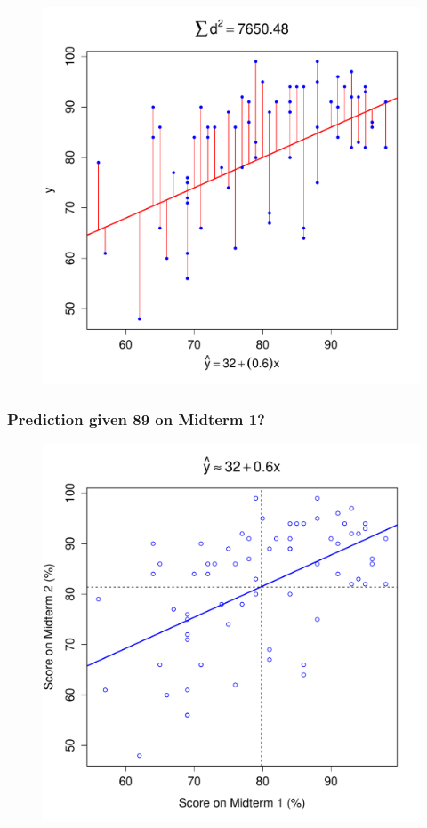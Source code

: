 \documentclass[handout]{beamer}
\begin{document}
\begin{frame}
\begin{figure}
	\includegraphics[scale = 0.48]{./images/SS4}
\end{figure}
\end{frame}
\begin{frame}
\frametitle{Prediction given 89 on Midterm 1? }
\begin{figure}
	\includegraphics[scale = 0.48]{./images/midterms5}
\end{figure}
\end{frame}
\end{document}
